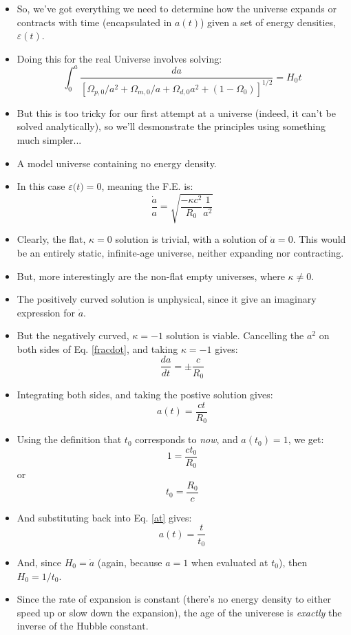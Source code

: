 \documentclass[11pt]{article}
\newcommand{\vep}[1]{\ensuremath{\varepsilon#1}}
\begin{document}
\begin{itemize}
\item So, we've got everything we need to determine how the universe expands or contracts with time (encapsulated in $a(t)$) given a set of energy densities, \vep{(t)}.
\item Doing this for the real Universe involves solving:
\begin{equation}
\int_0^a\frac{da}{\left[\Omega_{p,0}/a^2 + \Omega_{m,0}/a + \Omega_{d,0}a^2+(1-\Omega_0)\right]^{1/2}} = H_0t
\end{equation}
\item But this is too tricky for our first attempt at a universe (indeed, it can't be solved analytically), so we'll desmonstrate the principles using something much simpler...
\item A model universe containing no energy density.
\item In this case $\vep(t)=0$, meaning the F.E. is:
\begin{equation}
\label{fracdot}
    \frac{\dot{a}}{a} = \sqrt{\frac{-\kappa c^2}{R_0}\frac{1}{a^2}}
\end{equation}
\item Clearly, the flat, $\kappa=0$ solution is trivial, with a solution of $\dot{a}=0$. This would be an entirely static, infinite-age universe, neither expanding nor contracting.
\item But, more interestingly are the non-flat empty universes, where $\kappa\ne0$.
\item The positively curved solution is unphysical, since it give an imaginary expression for $\dot{a}$.
\item But the negatively curved, $\kappa=-1$ solution is viable. Cancelling the $a^2$ on both sides of Eq. \ref{fracdot}, and taking $\kappa=-1$ gives:
\begin{equation}
\frac{da}{dt} = \pm\frac{c}{R_0}
\end{equation}    
\item Integrating both sides, and taking the postive solution gives:
\begin{equation}
\label{at}
    a(t) = \frac{ct}{R_0}
\end{equation}    
\item Using the definition that $t_0$ corresponds to {\it now}, and $a(t_0)=1$, we get:
\begin{equation}
1 = \frac{ct_0}{R_0}
\end{equation}    
or
\begin{equation}
    t_0 = \frac{R_0}{c}
\end{equation}    
\item And substituting back into Eq. \ref{at} gives:
\begin{equation}
    a(t) = \frac{t}{t_0}
\end{equation}    
\item And, since $H_0=\dot{a}$ (again, because $a=1$ when evaluated at $t_0$), then $H_0=1/t_0$.
\item Since the rate of expansion is constant (there's no energy density to either speed up or slow down the expansion), the age of the univerese is {\it exactly} the inverse of the Hubble constant.

\end{itemize}
\end{document}
